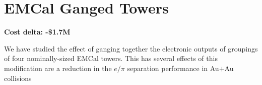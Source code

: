 \section*{EMCal Ganged Towers}
\label{emcal_ganging}

\textbf{Cost delta: -\$1.7M}

We have studied the effect of ganging together the electronic outputs
of groupings of four nominally-sized EMCal towers.  This has several 
effects of this modification are a reduction in the $e/\pi$ separation
performance in Au$+$Au collisions

